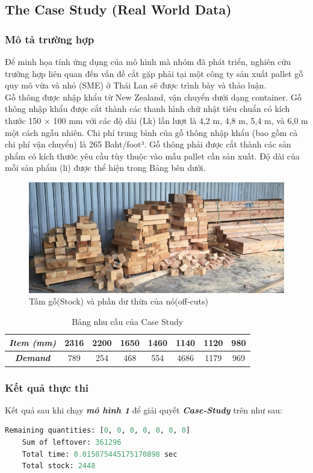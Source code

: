 \documentclass[a4paper]{article}
\begin{document}
\subsection{The Case Study (Real World Data)}
\subsubsection{Mô tả trường hợp}
\indent\indent Để minh họa tính ứng dụng của mô hình mà nhóm đã phát triển, nghiên cứu trường hợp liên quan đến vấn đề cắt gặp phải tại một công ty sản xuất pallet gỗ quy mô vừa và nhỏ (SME) ở Thái Lan sẽ được trình bày và thảo luận.\\
\indent Gỗ thông được nhập khẩu từ New Zealand, vận chuyển dưới dạng container. Gỗ thông nhập khẩu được cắt thành các thanh hình chữ nhật tiêu chuẩn có kích thước 150 × 100 mm với các độ dài (Lk) lần lượt là 4,2 m, 4,8 m, 5,4 m, và 6,0 m một cách ngẫu nhiên. Chi phí trung bình của gỗ thông nhập khẩu (bao gồm cả chi phí vận chuyển) là 265 Baht/foot³. Gỗ thông phải được cắt thành các sản phẩm có kích thước yêu cầu tùy thuộc vào mẫu pallet cần sản xuất. Độ dài của mỗi sản phẩm (li) được thể hiện trong Bảng bên dưới.
\begin{figure}[http]
    \centering
    \includegraphics[width=0.7\linewidth]{CaseStudyPicture.png}
    \caption{Tấm gỗ(Stock) và phần dư thừa của nó(off-cuts)}
    \label{tab:sample}
\end{figure}
\begin{table}[http]
\centering
\begin{tabular}{c|ccccccc}
  \textbf{\textit{Item (mm)}} & 2316 & 2200 & 1650 & 1460 &  1140 & 1120 & 980 \\
  \hline
  \textbf{\textit{Demand}} & 789 & 254 & 468 & 554 & 4686 & 1179 & 969 \\
\end{tabular}
\caption{Bảng nhu cầu của Case Study}
\label{tab:sample}
\end{table}

\subsubsection{Kết quả thực thi}
\indent\indent Kết quả sau khi chạy \textbf{\textit{mô hình 1}} để giải quyết \textbf{\textit{Case-Study}} trên như sau:
\begin{lstlisting}[language=Python,caption={Terminal Console}]
    Remaining quantities: [0, 0, 0, 0, 0, 0, 0]
    Sum of leftover: 361296
    Total time: 0.015075445175170898 sec
    Total stock: 2448
\end{lstlisting}
\end{document}
